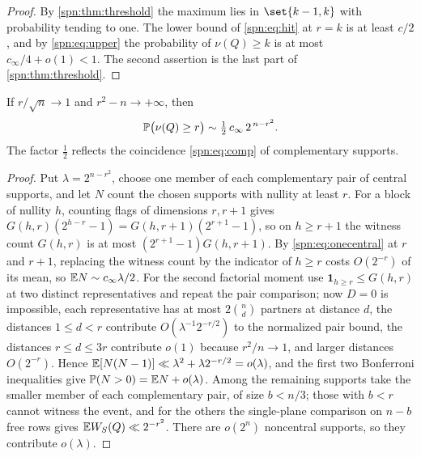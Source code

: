 \begin{proof}
By \cref{spn:thm:threshold} the maximum lies in $\set{k-1,k}$ with probability tending to one.
The lower bound of \eqref{spn:eq:hit} at $r=k$ is at least $c/2$, and by \eqref{spn:eq:upper}
the probability of $\nu(Q)\ge k$ is at most $c_\infty/4+o(1)<1$. The second assertion is the
last part of \cref{spn:thm:threshold}.
\end{proof}

\begin{proposition}\label{spn:prop:raretail}
If $r/\sqrt n\to1$ and $r^2-n\to+\infty$, then
\[
 \mathbb{P}\bigl(\nu(Q)\ge r\bigr)\sim\tfrac12\,c_\infty\,2^{\,n-r^2}.
\]
The factor $\tfrac12$ reflects the coincidence \eqref{spn:eq:comp} of complementary supports.
\end{proposition}

\begin{proof}
Put $\lambda=2^{n-r^2}$, choose one member of each complementary pair of central supports,
and let $N$ count the chosen supports with nullity at least $r$. For a block of nullity $h$,
counting flags of dimensions $r,r+1$ gives $G(h,r)(2^{h-r}-1)=G(h,r+1)(2^{r+1}-1)$, so on
$h\ge r+1$ the witness count $G(h,r)$ is at most $(2^{r+1}-1)G(h,r+1)$. By
\eqref{spn:eq:onecentral} at $r$ and $r+1$, replacing the witness count by the indicator of
$h\ge r$ costs $O(2^{-r})$ of its mean, so $\mathbb{E} N\sim c_\infty\lambda/2$. For the second
factorial moment use $\mathbf 1_{h\ge r}\le G(h,r)$ at two distinct representatives and repeat
the pair comparison; now $D=0$ is impossible, each representative has at most $2\binom nd$
partners at distance $d$, the distances $1\le d<r$ contribute $O(\lambda^{-1}2^{-r/2})$ to the
normalized pair bound, the distances $r\le d\le3r$ contribute $o(1)$ because $r^2/n\to1$, and
larger distances $O(2^{-r})$. Hence $\mathbb{E}[N(N-1)]\ll\lambda^2+\lambda2^{-r/2}=o(\lambda)$, and
the first two Bonferroni inequalities give $\mathbb{P}(N>0)=\mathbb{E} N+o(\lambda)$. Among the remaining
supports take the smaller member of each complementary pair, of size $b<n/3$; those with
$b<r$ cannot witness the event, and for the others the single-plane comparison on $n-b$ free
rows gives $\mathbb{E} W_S(Q)\ll2^{-r^2}$. There are $o(2^n)$ noncentral supports, so they
contribute $o(\lambda)$.
\end{proof}

